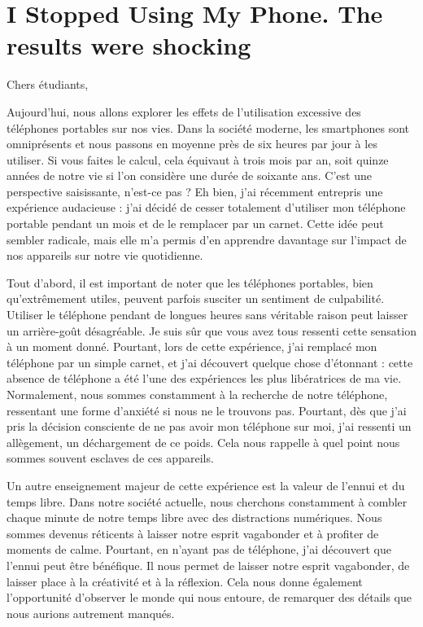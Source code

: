 \documentclass[a4paper, 10pt, garamond]{book}
\begin{document}
\chapter{I Stopped Using My Phone. The results were shocking}


Chers étudiants,

Aujourd'hui, nous allons explorer les effets de l'utilisation excessive des
téléphones portables sur nos vies. Dans la société moderne, les smartphones sont
omniprésents et nous passons en moyenne près de six heures par jour à les
utiliser. Si vous faites le calcul, cela équivaut à trois mois par an, soit
quinze années de notre vie si l'on considère une durée de soixante ans. C'est
une perspective saisissante, n'est-ce pas ? Eh bien, j'ai récemment entrepris
une expérience audacieuse : j'ai décidé de cesser totalement d'utiliser mon
téléphone portable pendant un mois et de le remplacer par un carnet. Cette idée
peut sembler radicale, mais elle m'a permis d'en apprendre davantage sur
l'impact de nos appareils sur notre vie quotidienne.

Tout d'abord, il est important de noter que les téléphones portables, bien
qu'extrêmement utiles, peuvent parfois susciter un sentiment de culpabilité.
Utiliser le téléphone pendant de longues heures sans véritable raison peut
laisser un arrière-goût désagréable. Je suis sûr que vous avez tous ressenti
cette sensation à un moment donné. Pourtant, lors de cette expérience, j'ai
remplacé mon téléphone par un simple carnet, et j'ai découvert quelque chose
d'étonnant : cette absence de téléphone a été l'une des expériences les plus
libératrices de ma vie. Normalement, nous sommes constamment à la recherche de
notre téléphone, ressentant une forme d'anxiété si nous ne le trouvons pas.
Pourtant, dès que j'ai pris la décision consciente de ne pas avoir mon téléphone
sur moi, j'ai ressenti un allègement, un déchargement de ce poids. Cela nous
rappelle à quel point nous sommes souvent esclaves de ces appareils.

Un autre enseignement majeur de cette expérience est la valeur de l'ennui et du
temps libre. Dans notre société actuelle, nous cherchons constamment à combler
chaque minute de notre temps libre avec des distractions numériques. Nous sommes
devenus réticents à laisser notre esprit vagabonder et à profiter de moments de
calme. Pourtant, en n'ayant pas de téléphone, j'ai découvert que l'ennui peut
être bénéfique. Il nous permet de laisser notre esprit vagabonder, de laisser
place à la créativité et à la réflexion. Cela nous donne également l'opportunité
d'observer le monde qui nous entoure, de remarquer des détails que nous aurions
autrement manqués.
\end{document}
